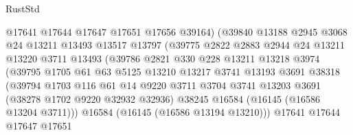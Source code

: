 \begin{lexlean}{RustStd}
\begin{coremodule}
                              @17641
                              @17644
                              @17647
                              @17651
                              @17656
                              @39164)
                            (@39840
                              @13188
                              @2945
                              @3068
                              @24
                              @13211
                              @13493
                              @13517
                              @13797
                              (@39775
                                @2822
                                @2883
                                @2944
                                @24
                                @13211
                                @13220
                                @3711
                                @13493
                                (@39786
                                  @2821
                                  @330
                                  @228
                                  @13211
                                  @13218
                                  @3974
                                  (@39795
                                    @1705
                                    @61
                                    @63
                                    @5125
                                    @13210
                                    @13217
                                    @3741
                                    @13193
                                    @3691
                                    @38318
                                    (@39794
                                      @1703
                                      @116
                                      @61
                                      @14
                                      @9220
                                      @3711
                                      @3704
                                      @3741
                                      @13203
                                      @3691
                                      (@38278 @1702 @9220 @32932 @32936)
                                      @38245
                                      @16584
                                      (@16145 (@16586 @13204 @3711)))
                                    @16584
                                    (@16145 (@16586 @13194 @13210)))
                                  @17641
                                  @17644
                                  @17647
                                  @17651

\end{coremodule}
\end{lexlean}
